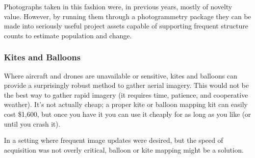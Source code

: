 \documentclass[a4paper,12pt,twoside]{article}
\begin{document}
Photographs taken in this fashion were, in previous years, mostly of novelty value. However, by running them through a photogrammetry package they can be made into seriously useful project assets capable of supporting frequent structure counts to estimate population and change.

\subsubsection{Kites and Balloons}
Where aircraft and drones are unavailable or sensitive, kites and balloons can provide a surprisingly robust method to gather aerial imagery. This would not be the best way to gather rapid imagery (it requires time, patience, and cooperative weather). It's not actually cheap; a proper kite or balloon mapping kit can easily cost \$1,600, but once you have it you can use it cheaply for as long as you like (or until you crash it).

In a setting where frequent image updates were desired, but the speed of acquisition was not overly critical, balloon or kite mapping might be a solution.
\end{document}
